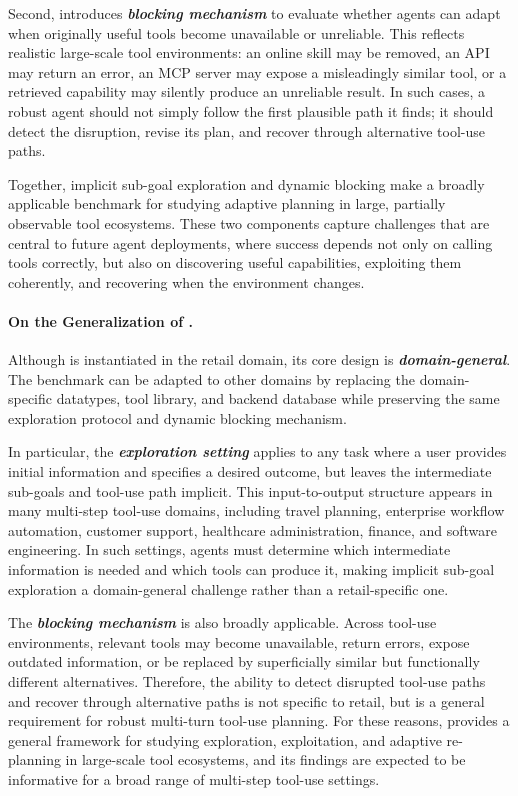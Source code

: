 Second, \bench{} introduces \textit{\textbf{blocking mechanism}} to evaluate whether agents can adapt when originally useful tools become unavailable or unreliable. 
This reflects realistic large-scale tool environments: an online skill may be removed, an API may return an error, an MCP server may expose a misleadingly similar tool, or a retrieved capability may silently produce an unreliable result. 
In such cases, a robust agent should not simply follow the first plausible path it finds; it should detect the disruption, revise its plan, and recover through alternative tool-use paths.

Together, implicit sub-goal exploration and dynamic blocking make \bench{} a broadly applicable benchmark for studying adaptive planning in large, partially observable tool ecosystems. 
These two components capture challenges that are central to future agent deployments, where success depends not only on calling tools correctly, but also on discovering useful capabilities, exploiting them coherently, and recovering when the environment changes.

\paragraph{On the Generalization of \bench{}.}

Although \bench{} is instantiated in the retail domain, its core design is \textit{\textbf{domain-general}}. 
The benchmark can be adapted to other domains by replacing the domain-specific datatypes, tool library, and backend database while preserving the same exploration protocol and dynamic blocking mechanism. 

In particular, the \textit{\textbf{exploration setting}} applies to any task where a user provides initial information and specifies a desired outcome, but leaves the intermediate sub-goals and tool-use path implicit. 
This input-to-output structure appears in many multi-step tool-use domains, including travel planning, enterprise workflow automation, customer support, healthcare administration, finance, and software engineering. 
In such settings, agents must determine which intermediate information is needed and which tools can produce it, making implicit sub-goal exploration a domain-general challenge rather than a retail-specific one.

The \textit{\textbf{blocking mechanism}} is also broadly applicable. 
Across tool-use environments, relevant tools may become unavailable, return errors, expose outdated information, or be replaced by superficially similar but functionally different alternatives. 
Therefore, the ability to detect disrupted tool-use paths and recover through alternative paths is not specific to retail, but is a general requirement for robust multi-turn tool-use planning. 
For these reasons, \bench{} provides a general framework for studying exploration, exploitation, and adaptive re-planning in large-scale tool ecosystems, and its findings are expected to be informative for a broad range of multi-step tool-use settings.

